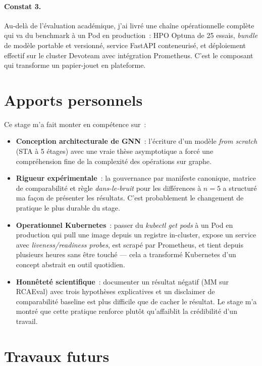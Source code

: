 \documentclass[a4paper,11pt,oneside]{report}
\begin{document}
\paragraph{Constat 3.} Au-del\`a de l'\'evaluation acad\'emique, j'ai livr\'e une cha\^ine op\'erationnelle compl\`ete qui va du benchmark \`a un Pod en production~: HPO Optuna de 25 essais, \emph{bundle} de mod\`ele portable et versionn\'e, service FastAPI conteneuris\'e, et d\'eploiement effectif sur le cluster Devoteam avec int\'egration Prometheus. C'est le composant qui transforme un papier-jouet en plateforme.

\section{Apports personnels}
\label{sec:concl-apports}

Ce stage m'a fait monter en comp\'etence sur~:
\begin{itemize}
  \item \textbf{Conception architecturale de GNN}~: l'\'ecriture d'un mod\`ele \emph{from scratch} (STA \`a 5 \'etages) avec une vraie th\`ese asymptotique a forc\'e une compr\'ehension fine de la complexit\'e des op\'erations sur graphe.
  \item \textbf{Rigueur exp\'erimentale}~: la gouvernance par manifeste canonique, matrice de comparabilit\'e et r\`egle \emph{dans-le-bruit} pour les diff\'erences \`a $n{=}5$ a structur\'e ma fa\c{c}on de pr\'esenter les r\'esultats. C'est probablement le changement de pratique le plus durable du stage.
  \item \textbf{Operationnel Kubernetes}~: passer du \emph{kubectl get pods} \`a un Pod en production qui pull une image depuis un registre in-cluster, expose un service avec \emph{liveness/readiness probes}, est scrap\'e par Prometheus, et tient depuis plusieurs heures sans \^etre touch\'e --- cela a transform\'e Kubernetes d'un concept abstrait en outil quotidien.
  \item \textbf{Honn\^etet\'e scientifique}~: documenter un r\'esultat n\'egatif (MM sur RCAEval) avec trois hypoth\`eses explicatives et un disclaimer de comparabilit\'e baseline est plus difficile que de cacher le r\'esultat. Le stage m'a montr\'e que cette pratique renforce plut\^ot qu'affaiblit la cr\'edibilit\'e d'un travail.
\end{itemize}

\section{Travaux futurs}
\label{sec:concl-futur}
\end{document}
